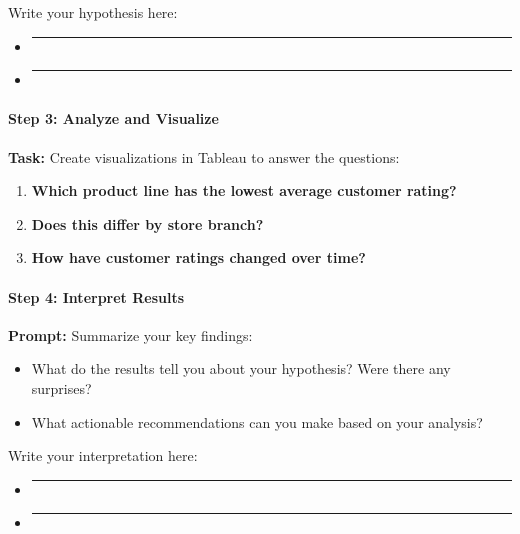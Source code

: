 \documentclass[
  11pt,
]{article}
\providecommand{\tightlist}{%
  \setlength{\itemsep}{0pt}\setlength{\parskip}{0pt}}
\begin{document}
Write your hypothesis here:

\begin{itemize}
\item
  \begin{center}\rule{0.5\linewidth}{0.5pt}\end{center}
\item
  \begin{center}\rule{0.5\linewidth}{0.5pt}\end{center}
\end{itemize}

\paragraph{Step 3: Analyze and
Visualize}\label{step-3-analyze-and-visualize}

\textbf{Task:} Create visualizations in Tableau to answer the questions:

\begin{enumerate}
\def\labelenumi{\arabic{enumi}.}
\item
  \textbf{Which product line has the lowest average customer rating?}
\item
  \textbf{Does this differ by store branch?}
\item
  \textbf{How have customer ratings changed over time?}
\end{enumerate}

\paragraph{Step 4: Interpret Results}\label{step-4-interpret-results}

\textbf{Prompt:} Summarize your key findings:

\begin{itemize}
\tightlist
\item
  What do the results tell you about your hypothesis? Were there any
  surprises?
\item
  What actionable recommendations can you make based on your analysis?
\end{itemize}

Write your interpretation here:

\begin{itemize}
\item
  \begin{center}\rule{0.5\linewidth}{0.5pt}\end{center}
\item
  \begin{center}\rule{0.5\linewidth}{0.5pt}\end{center}
\end{itemize}
\end{document}
